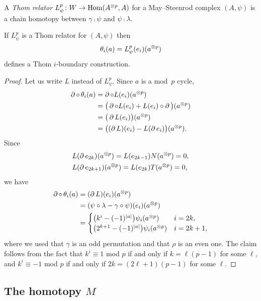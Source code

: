 A \textit{Thom relator} $L_\psi^p \colon W \to \mathrm{Hom}(A^{\otimes p}, A)$ for a May--Steenrod complex $(A, \psi)$ is a chain homotopy between $\gamma \comp \psi$ and $\psi \comp \lambda$.

\begin{theorem*}
	If $L_\psi^p$ is a Thom relator for $(A, \psi)$ then
	\[
	\theta_i(a) = L_\psi^p(e_i)(a^{\otimes p})
	\]
	defines a Thom $i$-boundary construction.
\end{theorem*}

\begin{proof}
	Let us write $L$ instead of $L_\psi^p$.
	Since $a$ is a mod~$p$ cycle,
	\begin{align*}
		\operatorname{\partial} \mathbin{\circ}\, \theta_i(a) & =
		\operatorname{\partial} \mathbin{\circ} L(e_i)(a^{\otimes p}) \\ & =
		\big(\operatorname{\partial} \mathbin{\circ} L(e_i) + L(e_i) \mathbin{\circ} \operatorname{\partial} \big) (a^{\otimes p}) \\ & =
		\big(\operatorname{\partial} L(e_i)\big)(a^{\otimes p}) \\ & =
		\big((\operatorname{\partial} L)(e_i) - L(\operatorname{\partial} e_i)\big)(a^{\otimes p}).
	\end{align*}
	Since
	\begin{align*}
		&L(\operatorname{\partial} e_{2k})(a^{\otimes p}) = L(e_{2k-1}) N(a^{\otimes p}) = 0, \\
		&L(\operatorname{\partial} e_{2k+1})(a^{\otimes p}) = L(e_{2k}) T(a^{\otimes p}) = 0,
	\end{align*}
	we have
	\begin{align*}
		\operatorname{\partial} \mathbin{\circ}\, \theta_i(a) & =
		(\operatorname{\partial} L)(e_i)(a^{\otimes p}) \\ & =
		(\psi \mathbin{\circ} \lambda - \gamma \mathbin{\circ} \psi)(e_i)(a^{\otimes p}) \\ & =
		\begin{cases}
			\big(k^i - (-1)^{\lvert a\rvert}\big) \psi_i(a^{\otimes p}) & i=2k, \\
			\big(2^{k+1} - (-1)^{\lvert a\rvert}\big) \psi_i(a^{\otimes p}) & i=2k+1,
		\end{cases}
	\end{align*}
	where we used that $\gamma$ is an odd permutation and that $\rho$ is an even one.
	The claim follows from the fact that $k^i \equiv 1$ mod $p$ if and only if $k = \ell(p-1)$ for some $\ell$, and $k^i \equiv -1$ mod $p$ if and only if $2k = (2\ell+1)(p-1)$ for some $\ell$.
\end{proof}

\subsection{The homotopy $M$}

\TBW

